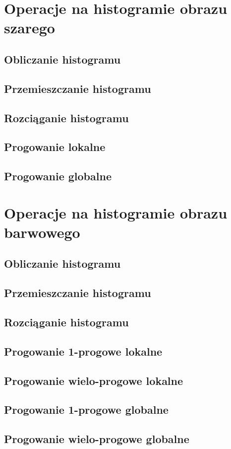 \documentclass[a4paper,12pt]{book}
\begin{document}
\chapter{Operacje na histogramie obrazu szarego}
\section{Obliczanie histogramu}
\section{Przemieszczanie histogramu}
\section{Rozciąganie histogramu}
\section{Progowanie lokalne}
\section{Progowanie globalne}

\chapter{Operacje na histogramie obrazu barwowego}
\section{Obliczanie histogramu}
\section{Przemieszczanie histogramu}
\section{Rozciąganie histogramu}
\section{Progowanie 1-progowe lokalne}
\section{Progowanie wielo-progowe lokalne}
\section{Progowanie 1-progowe globalne}
\section{Progowanie wielo-progowe globalne}
\end{document}
